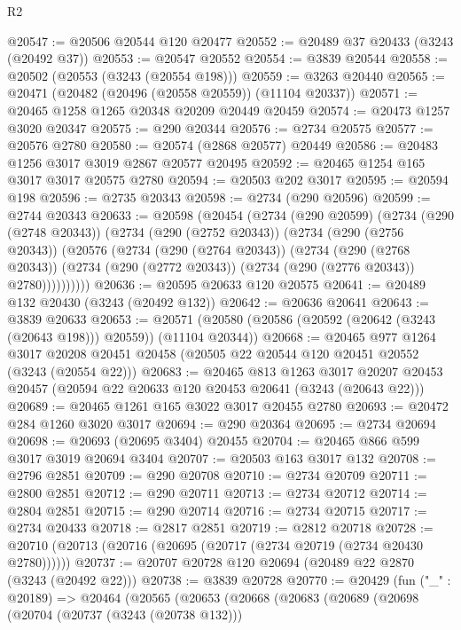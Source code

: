 \begin{lexlean}{R2}
\begin{coremodule}
@20547 := @20506 @20544 @120 @20477
@20552 := @20489 @37 @20433 (@3243 (@20492 @37))
@20553 := @20547 @20552
@20554 := @3839 @20544
@20558 := @20502 (@20553 (@3243 (@20554 @198)))
@20559 := @3263 @20440
@20565 := @20471 (@20482 (@20496 (@20558 @20559)) (@11104 @20337))
@20571 := @20465 @1258 @1265 @20348 @20209 @20449 @20459
@20574 := @20473 @1257 @3020 @20347
@20575 := @290 @20344
@20576 := @2734 @20575
@20577 := @20576 @2780
@20580 := @20574 (@2868 @20577) @20449
@20586 := @20483 @1256 @3017 @3019 @2867 @20577 @20495
@20592 := @20465 @1254 @165 @3017 @3017 @20575 @2780
@20594 := @20503 @202 @3017
@20595 := @20594 @198
@20596 := @2735 @20343
@20598 := @2734 (@290 @20596)
@20599 := @2744 @20343
@20633 := @20598
    (@20454
      (@2734
        (@290 @20599)
        (@2734
          (@290 (@2748 @20343))
          (@2734
            (@290 (@2752 @20343))
            (@2734
              (@290 (@2756 @20343))
              (@20576
                (@2734
                  (@290 (@2764 @20343))
                  (@2734
                    (@290 (@2768 @20343))
                    (@2734 (@290 (@2772 @20343)) (@2734 (@290 (@2776 @20343)) @2780))))))))))
@20636 := @20595 @20633 @120 @20575
@20641 := @20489 @132 @20430 (@3243 (@20492 @132))
@20642 := @20636 @20641
@20643 := @3839 @20633
@20653 := @20571 (@20580 (@20586 (@20592 (@20642 (@3243 (@20643 @198))) @20559)) (@11104 @20344))
@20668 := @20465
    @977
    @1264
    @3017
    @20208
    @20451
    @20458
    (@20505 @22 @20544 @120 @20451 @20552 (@3243 (@20554 @22)))
@20683 := @20465
    @813
    @1263
    @3017
    @20207
    @20453
    @20457
    (@20594 @22 @20633 @120 @20453 @20641 (@3243 (@20643 @22)))
@20689 := @20465 @1261 @165 @3022 @3017 @20455 @2780
@20693 := @20472 @284 @1260 @3020 @3017
@20694 := @290 @20364
@20695 := @2734 @20694
@20698 := @20693 (@20695 @3404) @20455
@20704 := @20465 @866 @599 @3017 @3019 @20694 @3404
@20707 := @20503 @163 @3017 @132
@20708 := @2796 @2851
@20709 := @290 @20708
@20710 := @2734 @20709
@20711 := @2800 @2851
@20712 := @290 @20711
@20713 := @2734 @20712
@20714 := @2804 @2851
@20715 := @290 @20714
@20716 := @2734 @20715
@20717 := @2734 @20433
@20718 := @2817 @2851
@20719 := @2812 @20718
@20728 := @20710 (@20713 (@20716 (@20695 (@20717 (@2734 @20719 (@2734 @20430 @2780))))))
@20737 := @20707 @20728 @120 @20694 (@20489 @22 @2870 (@3243 (@20492 @22)))
@20738 := @3839 @20728
@20770 := @20429
    (fun ("_" : @20189) =>
    @20464
      (@20565
        (@20653
          (@20668
            (@20683
              (@20689
                (@20698
                  (@20704
                    (@20737 (@3243 (@20738 @132)))

\end{coremodule}
\end{lexlean}
